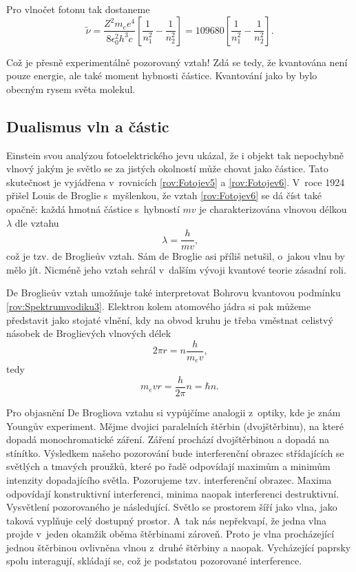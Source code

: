 \noindent Pro vlnočet fotonu tak dostaneme
\begin{equation}
\tilde{\nu} = \frac{Z^2m_e e^4}{8\epsilon_0^2 h^3c}\left[ \frac{1}{n_1^2} - \frac{1}{n_2^2} \right ] = 109680 \left[ \frac{1}{n_1^2} - \frac{1}{n_2^2} \right ].
\label{rov:Spektrumvodiku9}
\end{equation}

\noindent Což je přesně experimentálně pozorovaný vztah! Zdá se tedy, že kvantována není pouze energie, ale také moment hybnosti částice. Kvantování jako by bylo obecným rysem světa molekul. 

\subsection{Dualismus vln a částic}

Einstein svou analýzou fotoelektrického jevu ukázal, že i objekt tak nepochybně vlnový jakým je světlo se za jistých okolností může chovat jako částice. Tato skutečnost je vyjádřena v~rovnicích \ref{rov:Fotojev5} a \ref{rov:Fotojev6}. V~roce 1924 přišel Louis de Broglie s~myšlenkou, že vztah \ref{rov:Fotojev6} se dá číst také opačně: každá hmotná částice s~hybností $mv$ je charakterizována vlnovou délkou $\lambda$ dle vztahu
\begin{equation}
\boxed{\lambda = \frac{h}{mv}\mbox{,}}
\label{rov:Dualismus1}
\end{equation}
\noindent což je tzv. de Broglieův vztah. Sám de Broglie asi příliš netušil, o~jakou vlnu by mělo jít. Nicméně jeho vztah sehrál v~dalším vývoji kvantové teorie zásadní roli. 

De Broglieův vztah umožňuje také interpretovat Bohrovu kvantovou podmínku \ref{rov:Spektrumvodiku3}. Elektron kolem atomového jádra si pak můžeme představit jako stojaté vlnění, kdy na obvod kruhu je třeba vměstnat celistvý násobek de Broglievých vlnových délek
\begin{equation}
2\pi r = n \frac{h}{m_e v}\mbox{,}
\label{Dualismus2}
\end{equation}
tedy
\begin{equation}
m_e vr = \frac{h}{2\pi}n = \hbar n \mbox{.}
\label{Dualismus3}
\end{equation}

Pro objasnění De Brogliova vztahu si vypůjčíme analogii z~optiky, kde je znám Youngův experiment. Mějme dvojici paralelních štěrbin (dvojštěrbinu), na které dopadá monochromatické záření. Záření prochází dvojštěrbinou a  dopadá na stínítko. Výsledkem našeho pozorování bude interferenční obrazec střídajících se světlých a tmavých proužků, které po řadě odpovídají maximům a minimům intenzity dopadajícího světla. Pozorujeme tzv. interferenční obrazec. Maxima odpovídají konstruktivní interferenci, minima naopak interferenci destruktivní. Vysvětlení pozorovaného je následující. Světlo se prostorem šíří jako vlna, jako taková vyplňuje celý dostupný prostor. A~tak nás nepřekvapí, že jedna vlna projde v~jeden okamžik oběma štěrbinami zároveň. Proto je vlna procházející jednou štěrbinou ovlivněna vlnou z~druhé štěrbiny a naopak. Vycházející paprsky spolu interagují, skládají se, což je podstatou pozorované interference.

